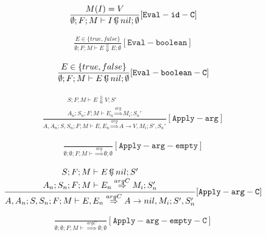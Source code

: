 \documentclass{scrartcl}
\DeclareMathOperator{\ceval}{\overset{C}{\smash{\Downarrow}}}
\begin{document}
    \begin{align*}
    \frac{
        M(I) = V
    }{
        \emptyset; F; M \vdash I  \ceval nil; \emptyset
    }[\mathtt{Eval-id-C}]
    \end{align*}
    
    \begin{align*}
    \frac{
        E \in \{true, false\}
    }{
        \emptyset; F; M \vdash E \Downarrow E; \emptyset
    }[\mathtt{Eval-boolean}]
    \end{align*}
    
    \begin{align*}
    \frac{
        E \in \{true, false\}
    }{
        \emptyset; F; M \vdash E  \ceval nil; \emptyset
    }[\mathtt{Eval-boolean-C}]
    \end{align*}
    
    \begin{align*}
    \frac{
        \begin{matrix}
        S; F; M \vdash E \Downarrow V; S' \\
        A_n; S_n; F; M \vdash E_n \overset{arg}{\Rightarrow} M_i; S_n'
        \end{matrix}
    }{
        A, A_n; S, S_n; F; M \vdash E, E_n \overset{arg}{\Rightarrow} A \to V, M_i; S', S_n'
    }[\mathtt{Apply-arg}]
    \end{align*}
    
    \begin{align*}
    \frac{}{
        \emptyset; \emptyset; F; M \vdash \overset{arg}{\Rightarrow} \emptyset; \emptyset
    }[\mathtt{Apply-arg-empty}]
    \end{align*}
    
    \begin{align*}
    \frac{
        \begin{matrix}
        S; F; M \vdash E  \ceval nil; S' \\
        A_n; S_n; F; M \vdash E_n \overset{argC}{\Rightarrow} M_i; S_n'
        \end{matrix}
    }{
        A, A_n; S, S_n; F; M \vdash E, E_n \overset{argC}{\Rightarrow} A \to nil, M_i; S', S_n'
    }[\mathtt{Apply-arg-C}]
    \end{align*}
    
    \begin{align*}
    \frac{}{
        \emptyset; \emptyset; F; M \vdash \overset{argC}{\Rightarrow} \emptyset; \emptyset
    }[\mathtt{Apply-arg-empty-C}]
    \end{align*}
    
\end{document}
